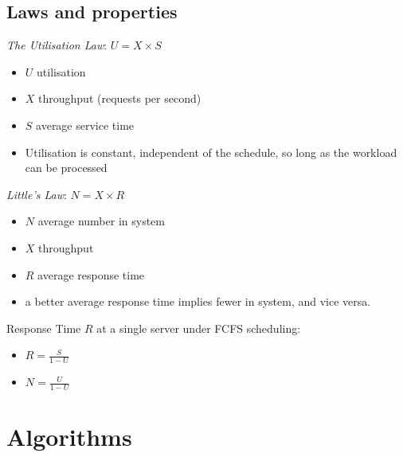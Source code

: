 \documentclass[11pt,a4paper]{article}
\begin{document}
\subsection{Laws and properties}

\emph{The Utilisation Law}: $U = X \times S$
\begin{itemize}
    \item $U$ utilisation
    \item $X$ throughput (requests per second)
    \item $S$ average service time
    \item Utilisation is constant, independent of the schedule, so long as the workload
        can be processed
\end{itemize}

\emph{Little's Law}: $N = X \times R$
\begin{itemize}
    \item $N$ average number in system
    \item $X$ throughput
    \item $R$ average response time
    \item a better average response time implies fewer in system, and vice versa.
\end{itemize}

Response Time $R$ at a single server under FCFS scheduling:
\begin{itemize}
    \item $R = \frac{S}{1-U}$
    \item $N = \frac{U}{1-U}$
\end{itemize}

\section{Algorithms}
\end{document}
